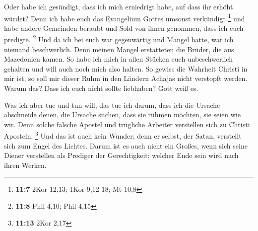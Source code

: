  Oder habe ich gesündigt, dass ich mich erniedrigt habe, auf
dass ihr erhöht würdet? Denn ich habe euch das Evangelium Gottes umsonst
verkündigt \footnote{\textbf{11:7} 2Kor 12,13; 1Kor 9,12-18; Mt 10,8}
 und habe andere Gemeinden beraubt und Sold von ihnen
genommen, dass ich euch predigte. \footnote{\textbf{11:8} Phil 4,10;
  Phil 4,15}  Und da ich bei euch war gegenwärtig und Mangel
hatte, war ich niemand beschwerlich. Denn meinen Mangel erstatteten die
Brüder, die aus Mazedonien kamen. So habe ich mich in allen Stücken euch
unbeschwerlich gehalten und will auch noch mich also halten.
 So gewiss die Wahrheit Christi in mir ist, so soll mir
dieser Ruhm in den Ländern Achajas nicht verstopft werden. 
Warum das? Dass ich euch nicht sollte liebhaben? Gott weiß es.

 Was ich aber tue und tun will, das tue ich darum, dass ich
die Ursache abschneide denen, die Ursache suchen, dass sie rühmen
möchten, sie seien wie wir.  Denn solche falsche Apostel
und trügliche Arbeiter verstellen sich zu Christi Aposteln. \footnote{\textbf{11:13}
  2Kor 2,17}  Und das ist auch kein Wunder; denn er selbst,
der Satan, verstellt sich zum Engel des Lichtes.  Darum ist
es auch nicht ein Großes, wenn sich seine Diener verstellen als Prediger
der Gerechtigkeit; welcher Ende sein wird nach ihren Werken.

